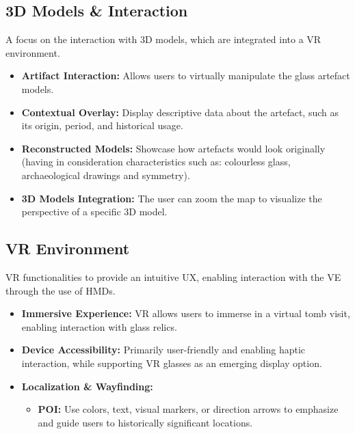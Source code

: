 \subsection*{\gls{3D} Models \& Interaction}
A focus on the interaction with \gls{3D} models, which are integrated into a \gls{VR} environment.
\begin{itemize}
    \item \textbf{Artifact Interaction:} Allows users to virtually manipulate the glass artefact models.
    \item \textbf{Contextual Overlay:} Display descriptive data about the artefact, such as its origin, period, and historical usage.
    \item \textbf{Reconstructed Models:} Showcase how artefacts would look originally (having in consideration characteristics such as: colourless glass, archaeological drawings and symmetry). 
    \item \textbf{3D Models Integration:} The user can zoom the map to visualize the perspective of a specific \gls{3D} model.
\end{itemize}

\subsection*{\gls{VR} Environment}
\gls{VR} functionalities to provide an intuitive \gls{UX}, enabling interaction with the \gls{VE} through the use of \glspl{HMD}.
\begin{itemize}
    \item \textbf{Immersive Experience:} \gls{VR} allows users to immerse in a virtual tomb visit, enabling interaction with glass relics.
    \item \textbf{Device Accessibility:} Primarily user-friendly and enabling haptic interaction, while supporting \gls{VR} glasses as an emerging display option.
    \item \textbf{Localization \& Wayfinding:} 
    \begin{itemize}
        \item \textbf{\gls{POI}:} Use colors, text, visual markers, or direction arrows to emphasize and guide users to historically significant locations.
    \end{itemize}
\end{itemize}

